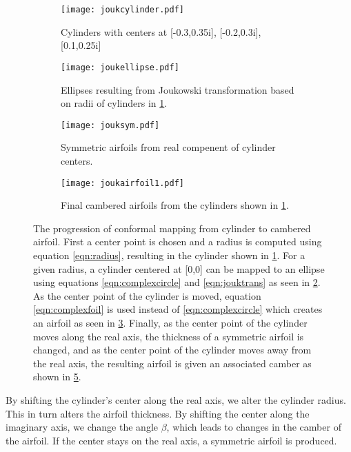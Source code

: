 \begin{figure}
	\centering
	\begin{subfigure}[t]{0.475\textwidth} %
		\centering
		\texttt{[image: joukcylinder.pdf]}
		\caption{Cylinders with centers at [-0.3,0.35i], [-0.2,0.3i], [0.1,0.25i]}
		\label{fig:joukcyl}
	\end{subfigure}
	\hfill
	\begin{subfigure}[t]{0.475\textwidth} %
		\centering
		\texttt{[image: joukellipse.pdf]}
		\caption{Ellipses resulting from Joukowski transformation based on radii of cylinders in \ref{fig:joukcyl}.}
		\label{fig:joukellipse}
	\end{subfigure}
	
	\begin{subfigure}[b]{0.475\textwidth} %
		\centering
		\texttt{[image: jouksym.pdf]}
		\caption{Symmetric airfoils from real compenent of cylinder centers.}
		\label{fig:jouksym}
	\end{subfigure}
	\hfill
	\begin{subfigure}[b]{0.475\textwidth} %
		\centering
		\texttt{[image: joukairfoil1.pdf]}
		\caption{Final cambered airfoils from the cylinders shown in \ref{fig:joukcyl}.}
		\label{fig:joukaf1}
	\end{subfigure}
	\caption{The progression of conformal mapping from cylinder to cambered airfoil. First a center point is chosen and a radius is computed using equation \ref{eqn:radius}, resulting in the cylinder shown in \ref{fig:joukcyl}. For a given radius, a cylinder centered at [0,0] can be mapped to an ellipse using equations \ref{eqn:complexcircle} and \ref{eqn:jouktrans} as seen in \ref{fig:joukellipse}. As the center point of the cylinder is moved, equation \ref{eqn:complexfoil} is used instead of \ref{eqn:complexcircle} which creates an airfoil as seen in \ref{fig:jouksym}. Finally, as the center point of the cylinder moves along the real axis, the thickness of a symmetric airfoil is changed, and as the center point of the cylinder moves away from the real axis, the resulting airfoil is given an associated camber as shown in \ref{fig:joukaf1}.} %
\end{figure}

By shifting the cylinder's center along the real axis, we alter the cylinder radius. This in turn alters the airfoil thickness. By shifting the center along the imaginary axis, we change the angle $\beta$, which leads to changes in the camber of the airfoil.  If the center stays on the real axis, a symmetric airfoil is produced.

